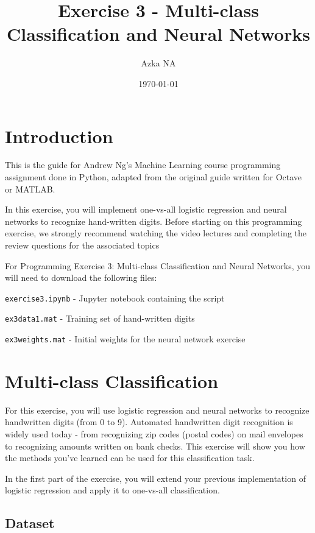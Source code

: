 \documentclass[12pt]{article}
\title{Exercise 3 - Multi-class Classification and Neural Networks}
\author{Azka NA}
\date{\today}
\begin{document}
\maketitle


\section{Introduction}
This is the guide for Andrew Ng's Machine Learning course programming assignment done in Python, adapted from the original guide written for Octave or MATLAB.

In this exercise, you will implement  one-vs-all logistic regression and neural networks to recognize hand-written digits. Before starting on this programming exercise, we strongly recommend watching the video lectures and completing the review questions for the associated topics

For Programming Exercise 3: Multi-class Classification and Neural Networks, you will need to download the following files:

\texttt{exercise3.ipynb} - Jupyter notebook containing the script

\texttt{ex3data1.mat} - Training set of hand-written digits

\texttt{ex3weights.mat} - Initial weights for the neural network exercise

\hrulefill

\section{Multi-class Classification}

For this exercise, you will use logistic regression and neural networks to recognize handwritten digits (from 0 to 9). Automated handwritten digit recognition is widely used today - from recognizing zip codes (postal codes) on mail envelopes to recognizing amounts written on bank checks. This exercise will show you how the methods you’ve learned can be used for this classification task.

In the first part of the exercise, you will extend your previous implementation of logistic regression and apply it to one-vs-all classification.

\subsection{Dataset}
\end{document}
